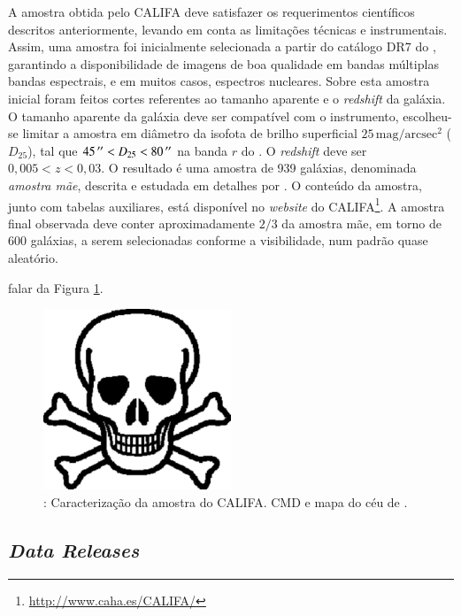 A amostra obtida pelo CALIFA deve satisfazer os requerimentos científicos
descritos anteriormente, levando em conta as limitações técnicas e
instrumentais. Assim, uma amostra foi inicialmente selecionada a partir do
catálogo DR7 do \SDSS \citep{Abazajian2009}, garantindo a disponibilidade de
imagens de boa qualidade em bandas múltiplas bandas espectrais, e em muitos
casos, espectros nucleares. Sobre esta amostra inicial foram feitos cortes
referentes ao tamanho aparente e o {\em redshift} da galáxia. O tamanho aparente
da galáxia deve ser compatível com o instrumento, escolheu-se limitar a amostra
em diâmetro da isofota de brilho superficial
$25\,\mathrm{mag}/\mathrm{arcsec}^2$ ($D_{25}$), tal que $45\,^{\prime\prime} < D_{25} <
80\,^{\prime\prime}$ na banda $r$ do \SDSS. O {\em redshift} deve ser $0,005 < z < 0,03$.
O resultado é uma amostra de 939 galáxias, denominada {\em amostra mãe},
descrita e estudada em detalhes por \citet{Walcher2014}. O conteúdo da amostra,
junto com tabelas auxiliares, está disponível no {\em website} do
CALIFA\footnote{\url{http://www.caha.es/CALIFA/}}. A amostra final observada
deve conter aproximadamente $2/3$ da amostra mãe, em torno de 600 galáxias, a
serem selecionadas conforme a visibilidade, num padrão quase aleatório.

\TODO falar da Figura \ref{fig:CALIFASample}.

\begin{figure}
	\includegraphics[width=0.5\textwidth]{figuras/test.pdf}
	\caption[Caracterização da amostra do CALIFA.]
	{\TODO: Caracterização da amostra do CALIFA. CMD e mapa do céu de
	\citet{Sanchez2012}.}
	\label{fig:CALIFASample}
\end{figure}

\subsection{{\em Data Releases}}

